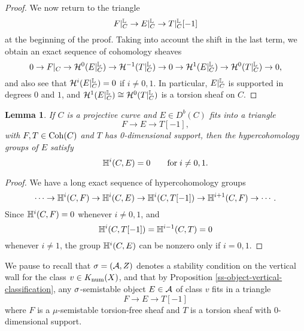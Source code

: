 \documentclass[letterpaper,11pt]{amsart}%
\newtheorem{lem}[thm]{Lemma}
\theoremstyle{remark}
\begin{document}
\begin{proof}
We now return to the triangle
\[ F|_C^{\mathbb{L}} \to E|_C^{\mathbb{L}} \to T|_C^{\mathbb{L}}[-1] \]
at the beginning of the proof. Taking into account the shift in the last term, we obtain an exact sequence of cohomology sheaves
\[ 0 \to F|_C \to \mathcal{H}^0(E|_C^{\mathbb{L}}) \to \mathcal{H}^{-1}(T|_C^{\mathbb{L}}) \to 0 \to \mathcal{H}^1(E|_C^{\mathbb{L}}) \to \mathcal{H}^0(T|_C^{\mathbb{L}}) \to 0, \]
and also see that $\mathcal{H}^i(E|_C^{\mathbb{L}}) = 0$ if $i \neq 0,1$. In particular, $E|_C^{\mathbb{L}}$ is supported in degrees $0$ and $1$, and $\mathcal{H}^1(E|_C^{\mathbb{L}}) \cong \mathcal{H}^0(T|_C^{\mathbb{L}})$ is a torsion sheaf on $C$.
\fi
\end{proof}

\begin{lem}\label{hypercohovanishing}
    If $C$ is a projective curve and $E \in D^b(C)$ fits into a triangle
    \[ F \to E \to T[-1], \]
    with $F, T \in \mathrm{Coh}(C)$ and $T$ has 0-dimensional support, then the hypercohomology groups of $E$ satisfy
    \[ \mathbb{H}^i(C, E) = 0 \qquad \mathrm{for} \; i \neq 0, 1. \]
\end{lem}
\begin{proof}
    We have a long exact sequence of hypercohomology groups
    \[ \cdots \to \mathbb{H}^i(C, F) \to \mathbb{H}^i(C, E) \to \mathbb{H}^i(C, T[-1]) \to \mathbb{H}^{i+1}(C, F) \to \cdots. \]
    Since $\mathbb{H}^i(C, F) = 0$ whenever $i \neq 0, 1$, and 
    \[ \mathbb{H}^i(C, T[-1]) = \mathbb{H}^{i-1}(C, T) = 0 \] 
    whenever $i \neq 1$, the group $\mathbb{H}^i(C, E)$ can be nonzero only if $i = 0,1$.
\end{proof}

We pause to recall that $\sigma = (\mathcal{A}, Z)$ denotes a stability condition on the vertical wall for the class $v \in K_{\mathrm{num}}(X)$, and that by Proposition \ref{ss-object-vertical-classification}, any $\sigma$-semistable object $E \in \mathcal{A}$ of class $v$ fits in a triangle
\[ F \to E \to T[-1] \]
where $F$ is a $\mu$-semistable torsion-free sheaf and $T$ is a torsion sheaf with 0-dimensional support. 
\end{document}

